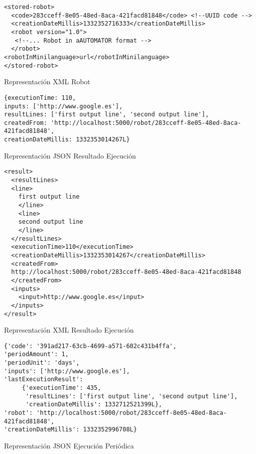 \begin{table}
\begin{verbatim}
<stored-robot>
  <code>283cceff-8e05-48ed-8aca-421facd81848</code> <!--UUID code -->
  <creationDateMillis>1332352716333</creationDateMillis>
  <robot version="1.0">
   <!--... Robot in aAUTOMATOR format -->
  </robot>
<robotInMinilanguage>url</robotInMinilanguage>
</stored-robot>
\end{verbatim}
\caption{Representación XML Robot}
\label{robot_xml_representation}
\end{table}

\begin{table}
\begin{verbatim}
{executionTime: 110,
inputs: ['http://www.google.es'],
resultLines: ['first output line', 'second output line'],
createdFrom: 'http://localhost:5000/robot/283cceff-8e05-48ed-8aca-421facd81848',
creationDateMillis: 1332353014267L}
\end{verbatim}
\caption{Representación JSON Resultado Ejecución}
\label{execution_json_representation}
\end{table}

\begin{table}
\begin{verbatim}
<result>
  <resultLines>
  <line>
    first output line
    </line>
    <line>
    second output line
    </line>
  </resultLines>
  <executionTime>110</executionTime>
  <creationDateMillis>1332353014267</creationDateMillis>
  <createdFrom>
  http://localhost:5000/robot/283cceff-8e05-48ed-8aca-421facd81848
  </createdFrom>
  <inputs>
    <input>http://www.google.es</input>
  </inputs>
</result>
\end{verbatim}
\caption{Representación XML Resultado Ejecución}
\label{execution_xml_representation}
\end{table}

\begin{table}
\begin{verbatim}
{'code': '391ad217-63cb-4699-a571-602c431b4ffa',
'periodAmount': 1,
'periodUnit': 'days',
'inputs': ['http://www.google.es'],
'lastExecutionResult':
     {'executionTime': 435,
      'resultLines': ['first output line', 'second output line'],
      'creationDateMillis': 1332712521399L},
'robot': 'http://localhost:5000/robot/283cceff-8e05-48ed-8aca-421facd81848',
'creationDateMillis': 1332352996708L}
\end{verbatim}
\caption{Representación JSON Ejecución Periódica}
\label{periodical_execution_json_representation}
\end{table}

